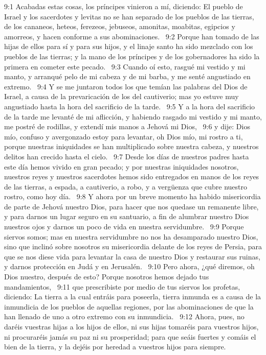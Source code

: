 9:1 Acabadas estas cosas, los príncipes vinieron a mí, diciendo: El pueblo de Israel y los sacerdotes y levitas no se han separado de los pueblos de las tierras, de los cananeos, heteos, ferezeos, jebuseos, amonitas, moabitas, egipcios y amorreos, y hacen conforme a sus abominaciones.  
9:2 Porque han tomado de las hijas de ellos para sí y para sus hijos, y el linaje santo ha sido mezclado con los pueblos de las tierras; y la mano de los príncipes y de los gobernadores ha sido la primera en cometer este pecado.  
9:3 Cuando oí esto, rasgué mi vestido y mi manto, y arranqué pelo de mi cabeza y de mi barba, y me senté angustiado en extremo.  
9:4 Y se me juntaron todos los que temían las palabras del Dios de Israel, a causa de la prevaricación de los del cautiverio; mas yo estuve muy angustiado hasta la hora del sacrificio de la tarde.  
9:5 Y a la hora del sacrificio de la tarde me levanté de mi aflicción, y habiendo rasgado mi vestido y mi manto, me postré de rodillas, y extendí mis manos a Jehová mi Dios,  
9:6 y dije: Dios mío, confuso y avergonzado estoy para levantar, oh Dios mío, mi rostro a ti, porque nuestras iniquidades se han multiplicado sobre nuestra cabeza, y nuestros delitos han crecido hasta el cielo.  
9:7 Desde los días de nuestros padres hasta este día hemos vivido en gran pecado; y por nuestras iniquidades nosotros, nuestros reyes y nuestros sacerdotes hemos sido entregados en manos de los reyes de las tierras, a espada, a cautiverio, a robo, y a vergüenza que cubre nuestro rostro, como hoy día.  
9:8 Y ahora por un breve momento ha habido misericordia de parte de Jehová nuestro Dios, para hacer que nos quedase un remanente libre, y para darnos un lugar seguro en su santuario, a fin de alumbrar nuestro Dios nuestros ojos y darnos un poco de vida en nuestra servidumbre.  
9:9 Porque siervos somos; mas en nuestra servidumbre no nos ha desamparado nuestro Dios, sino que inclinó sobre nosotros su misericordia delante de los reyes de Persia, para que se nos diese vida para levantar la casa de nuestro Dios y restaurar sus ruinas, y darnos protección en Judá y en Jerusalén.  
9:10 Pero ahora, ¿qué diremos, oh Dios nuestro, después de esto? Porque nosotros hemos dejado tus mandamientos,  
9:11 que prescribiste por medio de tus siervos los profetas, diciendo: La tierra a la cual entráis para poseerla, tierra inmunda es a causa de la inmundicia de los pueblos de aquellas regiones, por las abominaciones de que la han llenado de uno a otro extremo con su inmundicia.  
9:12 Ahora, pues, no daréis vuestras hijas a los hijos de ellos, ni sus hijas tomaréis para vuestros hijos, ni procuraréis jamás su paz ni su prosperidad; para que seáis fuertes y comáis el bien de la tierra, y la dejéis por heredad a vuestros hijos para siempre.  
